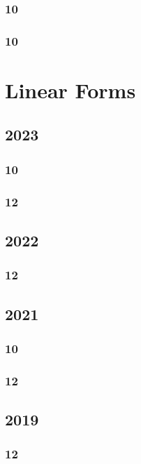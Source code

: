 \documentclass[11pt]{book}
\begin{document}
\subsection{10}

\subsection{10}



\chapter{Linear Forms}
\section{2023}
\subsection{10}

\subsection{12}                                                                                                  

\section{2022}

\subsection{12}

\section{2021}
\subsection{10}

\subsection{12}

\section{2019}
\subsection{12}

\end{document}
